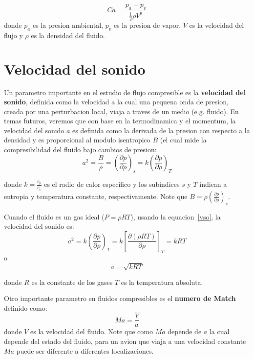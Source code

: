 \documentclass[10pt, oneside]{article}
\begin{document}
\begin{equation}
Ca = \frac{p_a - p_v}{\frac{1}{2}\rho V^2}
\label{can}
\end{equation}
donde $p_a$ es la presion ambiental, $p_v$ es la presion de vapor, $V$ es la velocidad del flujo y $\rho$ es la densidad del fluido.


\section{Velocidad del sonido}
Un parametro importante en el estudio de flujo compresible es la \textbf{velocidad del sonido}, definida como la velocidad a la cual una pequena onda de presion, creada por una perturbacion local, viaja a traves de un medio (e.g. fluido). En temas futuros, veremos que con base en la termodinamica y el momentum, la velocidad del sonido $a$ es definida como la derivada de la presion con respecto a la densidad y es proporcional al modulo isentropico $B$ (el cual mide la compresibilidad del fluido bajo cambios de presion:
\begin{equation}
a^2 = \frac{B}{\rho} = \left (\frac{\partial p}{\partial \rho} \right )_s = k \left (\frac{\partial p}{\partial \rho} \right )_T 
\label{vso}
\end{equation}

donde $k=\frac{c_p}{c_v}$ es el radio de calor especifico y los subindices $s$ y $T$ indican a entropia y temperatura constante, respectivamente. Note que $B= \rho \left (\frac{\partial p}{\partial \rho} \right )_s$. 

Cuando el fluido es  un gas ideal ($P=\rho RT$), usando la equacion~\ref{vso}, la velocidad del sonido es:
\begin{equation}
a^2 = k \left (\frac{\partial p}{\partial \rho} \right )_T = k \left[ \frac{\partial (\rho RT)}{\partial \rho} \right]_T = kRT
\end{equation}
o
\begin{equation}
a = \sqrt{kRT}
\end{equation}

donde $R$ es la constante de los gases $T$ es la temperatura absoluta. 

Otro importante parametro en fluidos compresibles es el \textbf{numero de Match} definido como:
\begin{equation}
Ma = \frac{V}{a}
\end{equation}
donde $V$ es la velocidad del fluido. Note que como $Ma$ depende de $a$ la cual depende del estado del fluido, para un avion que viaja a una velocidad constante $Ma$ puede ser diferente a diferentes localizaciones.
\end{document}
